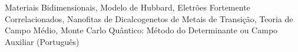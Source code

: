 \begin{palavraschave}
Materiais Bidimensionais, Modelo de Hubbard, Eletrões Fortemente Correlacionados, Nanofitas de Dicalcogenetos de Metais de Transição, Teoria de Campo Médio, Monte Carlo Quântico: Método do Determinante ou Campo Auxiliar (Português)
\end{palavraschave}
\clearpage
\thispagestyle{empty}
\cleardoublepage